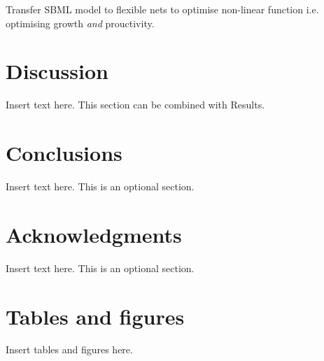 \documentclass[a4paper, 12pt]{scrartcl}
\begin{document}
Transfer SBML model to flexible nets to optimise non-linear function i.e. optimising growth \emph{and} prouctivity.
  
\section*{Discussion}
\label{sec:discussion}

Insert text here.  This section can be combined with Results.

\section*{Conclusions}
\label{sec:conclusions}

Insert text here.  This is an optional section.

\section*{Acknowledgments}
\label{sec:ack}

Insert text here.  This is an optional section.

\printbibliography

\section*{Tables and figures}

Insert tables and figures here.
\end{document}
